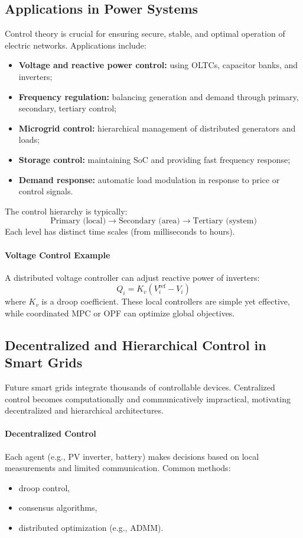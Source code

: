 \documentclass[11pt]{article}
\begin{document}
	\subsection{Applications in Power Systems}
	
	Control theory is crucial for ensuring secure, stable, and optimal operation of electric networks.  
	Applications include:
	
	\begin{itemize}
		\item \textbf{Voltage and reactive power control:} using OLTCs, capacitor banks, and inverters;
		\item \textbf{Frequency regulation:} balancing generation and demand through primary, secondary, tertiary control;
		\item \textbf{Microgrid control:} hierarchical management of distributed generators and loads;
		\item \textbf{Storage control:} maintaining SoC and providing fast frequency response;
		\item \textbf{Demand response:} automatic load modulation in response to price or control signals.
	\end{itemize}
	
	The control hierarchy is typically:
	\[
	\text{Primary (local)} \rightarrow \text{Secondary (area)} \rightarrow \text{Tertiary (system)}
	\]
	Each level has distinct time scales (from milliseconds to hours).
	
	\paragraph{Voltage Control Example}
	
	A distributed voltage controller can adjust reactive power of inverters:
	\[
	Q_i = K_v (V_i^\text{ref} - V_i)
	\]
	where $K_v$ is a droop coefficient.  
	These local controllers are simple yet effective, while coordinated MPC or OPF can optimize global objectives.
	
	\subsection{Decentralized and Hierarchical Control in Smart Grids}
	
	Future smart grids integrate thousands of controllable devices.  
	Centralized control becomes computationally and communicatively impractical, motivating decentralized and hierarchical architectures.
	
	\paragraph{Decentralized Control}
	Each agent (e.g., PV inverter, battery) makes decisions based on local measurements and limited communication.  
	Common methods:
	\begin{itemize}
		\item droop control,
		\item consensus algorithms,
		\item distributed optimization (e.g., ADMM).
	\end{itemize}
	
\end{document}
